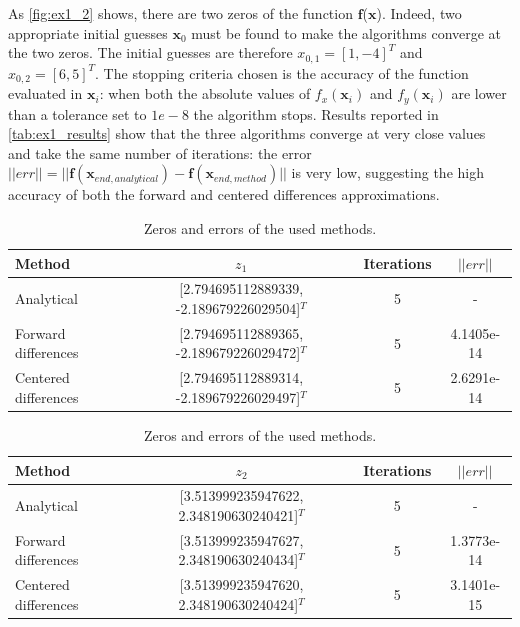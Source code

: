 \documentclass[11pt,a4paper,oneside]{article}
\renewcommand{\vec}[1]{\mathbf{#1}}
\begin{document}
As \autoref{fig:ex1_2} shows, there are two zeros of the function $\vec{f}$($\vec{x}$). 
Indeed, two appropriate initial guesses $\vec{x}_0$ must be found to make the algorithms converge 
at the two zeros. The initial guesses are therefore $x_{0,1}={[1, -4]}^T$ and $x_{0,2}={[6, 5]}^T$. 
The stopping criteria chosen is the accuracy of the function evaluated in $\vec{x}_i$: when both 
the absolute values of $f_x(\vec{x}_i)$ and $f_y(\vec{x}_i)$ are lower than a tolerance set to ${1e-8}$ 
the algorithm stops. Results reported in \autoref{tab:ex1_results} show that the three algorithms 
converge at very close values and take the same number of iterations: the error 
$||err||=||\vec{f}(\vec{x}_{end,analytical}) - \vec{f}(\vec{x}_{end,method})||$ is very low, 
suggesting the high accuracy of both the forward and centered differences approximations.
\begin{table}[ht]
    \centering
    \begin{tabular}{l|c c c}
        \textbf{Method} & \mbox{\boldmath $z_1$} & \textbf{Iterations} &  \mbox{\boldmath $||err||$} \\
        \midrule
        \midrule
        Analytical                  & [2.794695112889339, -2.189679226029504]$^T$  & 5 & -\\
        Forward differences         & [2.794695112889365, -2.189679226029472]$^T$  & 5 & 4.1405e-14\\
        Centered differences        & [2.794695112889314, -2.189679226029497]$^T$  & 5 & 2.6291e-14\\
        \toprule
    \end{tabular}
    \begin{tabular}{l|c c c}
        \textbf{Method} & \mbox{\boldmath $z_2$} & \textbf{Iterations} &  \mbox{\boldmath $||err||$} \\
        \midrule
        \midrule
        Analytical                  & [3.513999235947622, 2.348190630240421]$^T$  & 5 & -\\
        Forward differences         & [3.513999235947627, 2.348190630240434]$^T$  & 5 & 1.3773e-14\\
        Centered differences        & [3.513999235947620, 2.348190630240424]$^T$  & 5 & 3.1401e-15\\
    \end{tabular}
    \caption{Zeros and errors of the used methods.}\label{tab:ex1_results}
\end{table}

\end{document}

